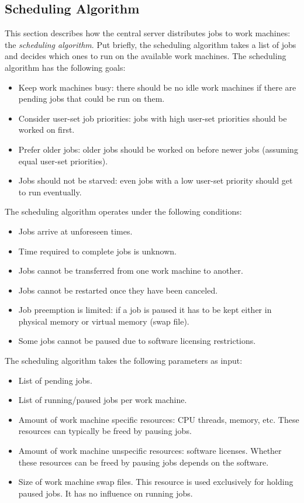 \subsection{Scheduling Algorithm}
This section describes how the central server distributes jobs to work machines: the \textit{scheduling algorithm}.
Put briefly, the scheduling algorithm takes a list of jobs and decides which ones to run on the available work machines.
The scheduling algorithm has the following goals:
\begin{itemize}
  \item Keep work machines busy: there should be no idle work machines if there are pending jobs that could be run on them.
  \item Consider user-set job priorities: jobs with high user-set priorities should be worked on first.
  \item Prefer older jobs: older jobs should be worked on before newer jobs (assuming equal user-set priorities).
  \item Jobs should not be starved: even jobs with a low user-set priority should get to run eventually.
\end{itemize}
The scheduling algorithm operates under the following conditions:
\begin{itemize}
  \item Jobs arrive at unforeseen times.
  \item Time required to complete jobs is unknown.
  \item Jobs cannot be transferred from one work machine to another.
  \item Jobs cannot be restarted once they have been canceled.
  \item Job preemption is limited: if a job is paused it has to be kept either in physical memory or virtual memory (swap file).
  \item Some jobs cannot be paused due to software licensing restrictions.
\end{itemize}
The scheduling algorithm takes the following parameters as input:
\begin{itemize}
  \item List of pending jobs.
  \item List of running/paused jobs per work machine.
  \item Amount of work machine specific resources: CPU threads, memory, etc.
  These resources can typically be freed by pausing jobs.
  \item Amount of work machine unspecific resources: software licenses.
  Whether these resources can be freed by pausing jobs depends on the software.
  \item Size of work machine swap files.
  This resource is used exclusively for holding paused jobs.
  It has no influence on running jobs.
\end{itemize}
